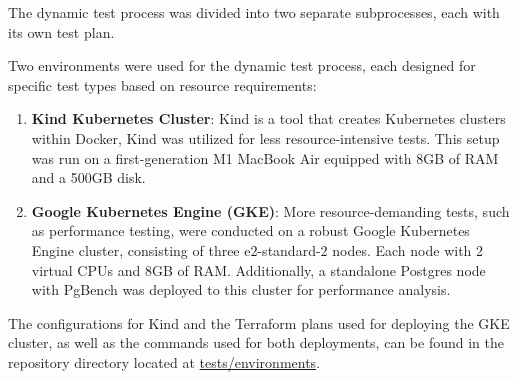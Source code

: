 


The dynamic test process was divided into two separate subprocesses, each with its own
test plan.

Two environments were used for the dynamic test process, each designed for specific test types based on resource requirements:

\begin{enumerate}
    \item \textbf{Kind Kubernetes Cluster}: Kind is a tool that creates Kubernetes clusters within Docker, Kind was utilized for less resource-intensive tests. This setup was run on a first-generation M1 MacBook Air equipped with 8GB of RAM and a 500GB disk.
    \item \textbf{Google Kubernetes Engine (GKE)}: More resource-demanding tests, such as performance testing, were conducted on a robust Google Kubernetes Engine cluster, consisting of three e2-standard-2 nodes. Each node with 2 virtual CPUs and 8GB of RAM. Additionally, a standalone Postgres node with PgBench was deployed to this cluster for performance analysis.
\end{enumerate}

The configurations for Kind and the Terraform plans used for deploying the GKE cluster, as well as the commands used for both deployments, can be found in the repository directory located at \url{tests/environments}.

